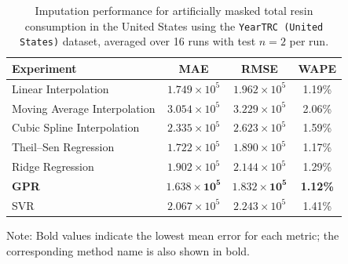 \begin{table}[H]
	\caption{Imputation performance for artificially masked total resin consumption in the United States using the \texttt{YearTRC (United States)} dataset, averaged over 16 runs with test \(n=2\) per run.}
	\begin{tabularx}{\textwidth}{lCCC}
		\toprule
		\textbf{Experiment} & \textbf{MAE} & \textbf{RMSE} & \textbf{WAPE} \\
		\midrule
		Linear Interpolation & \(1.749 \times 10^{5}\) & \(1.962 \times 10^{5}\) & 1.19\% \\
		Moving Average Interpolation & \(3.054 \times 10^{5}\) & \(3.229 \times 10^{5}\) & 2.06\% \\
		Cubic Spline Interpolation & \(2.335 \times 10^{5}\) & \(2.623 \times 10^{5}\) & 1.59\% \\
		Theil--Sen Regression & \(1.722 \times 10^{5}\) & \(1.890 \times 10^{5}\) & 1.17\% \\
		Ridge Regression & \(1.902 \times 10^{5}\) & \(2.144 \times 10^{5}\) & 1.29\% \\
		\textbf{GPR} & \(\mathbf{1.638 \times 10^{5}}\) & \(\mathbf{1.832 \times 10^{5}}\) & \textbf{1.12\%} \\
		SVR & \(2.067 \times 10^{5}\) & \(2.243 \times 10^{5}\) & 1.41\% \\
		\bottomrule
	\end{tabularx}
	\smallskip
	{\footnotesize
	Note: Bold values indicate the lowest mean error for each metric; the corresponding method name is also shown in bold.\par
	}
	\label{tab:imputation_united_states_trc}
\end{table}
